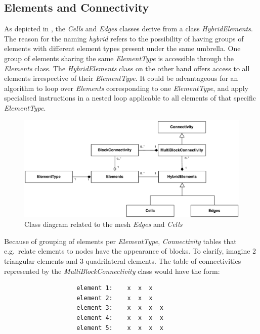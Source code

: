 \subsection{Elements and Connectivity}
%
As depicted in , the \emph{Cells} and \emph{Edges} classes
derive from a class \emph{HybridElements}. The reason for the naming
\emph{hybrid} refers to the possibility of having groups of elements with
different element types present under the same umbrella. One group of elements
sharing the same \emph{ElementType} is accessible through the \emph{Elements}
class. The \emph{HybridElements} class on the other hand offers access to all
elements irrespective of their \emph{ElementType}. It could be advantageous for
an algorithm to loop over \emph{Elements} corresponding to one
\emph{ElementType}, and apply specialised instructions in a nested loop
applicable to all elements of that specific \emph{ElementType}.\\
\begin{figure}
\centering
\includegraphics[width=\textwidth]{imgs/elements.pdf}
\caption{Class diagram related to the mesh \emph{Edges} and \emph{Cells}
\label{fig:elements}}
\end{figure}
Because of grouping of elements per \emph{ElementType}, \emph{Connectivity}
tables that e.g.~relate elements to nodes have the appearance of blocks. To
clarify, imagine 2 triangular elements and 3 quadrilateral elements. The table
of connectivities represented by the \emph{MultiBlockConnectivity} class would
have the form:\\[10pt]
\begin{minipage}{\textwidth}
\begin{verbatim}
                    element 1:    x  x  x
                    element 2:    x  x  x
                    element 3:    x  x  x  x
                    element 4:    x  x  x  x
                    element 5:    x  x  x  x
\end{verbatim}
\end{minipage}\\[10pt]
